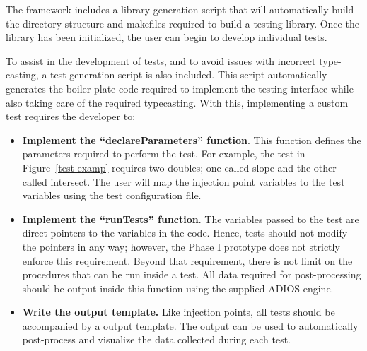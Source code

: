 The framework includes a library generation script that will automatically build the directory structure and makefiles required to 
build a testing library. Once the library has been initialized, the user can begin to develop individual tests. 

To assist in the development of tests, and to avoid issues with incorrect type-casting, a test generation script is also included. This script automatically generates the boiler plate code required to implement the testing interface while also taking care of the required typecasting. With this, implementing a custom test requires the developer to:



\begin{itemize}
 \item {\bf Implement the ``declareParameters'' function}. This function defines the parameters required to perform
 the test. For example, the test in Figure~\ref{test-examp} requires two doubles; one called slope and the other called intersect. The user will map the injection point variables to the test variables using the test configuration file. 
 \item {\bf Implement the ``runTests'' function}. The variables passed to the test are direct pointers to the variables in the code. Hence, tests should not modify the pointers in any way; however, the Phase I prototype does not strictly enforce this requirement. Beyond that requirement, there is not limit on the procedures that can be run inside a test. All data required for post-processing should be output inside this function using the supplied ADIOS engine. 
 \item {\bf Write the output template.} Like injection points, all tests should be accompanied by a output template. The output can be used to automatically post-process and visualize the data collected during each test. 
\end{itemize}


